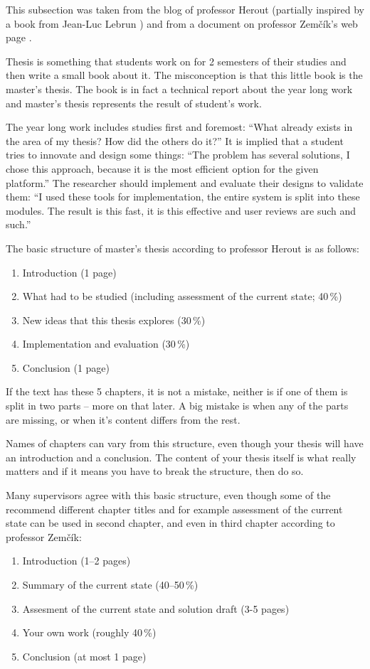 {{This subsection was taken from the blog of professor Herout\cite{Herout} (partially inspired by a book from Jean-Luc Lebrun \cite{Lebrun2011}) and from a document on professor Zemčík's web page \cite{Zemcik}.
\bigskip

Thesis is something that students work on for 2 semesters of their studies and then write a small book about it. The misconception is that this little book is the master's thesis. The book is in fact a technical report about the year long work and master's thesis represents the result of student's work.

The year long work includes studies first and foremost: ``What already exists in the area of my thesis? How did the others do it?'' It is implied that a student tries to innovate and design some things: ``The problem has several solutions, I chose this approach, because it is the most efficient option for the given platform.''
The researcher should implement and evaluate their designs to validate them: ``I used these tools for implementation, the entire system is split into these modules. The result is this fast, it is this effective and user reviews are such and such.''

The basic structure of master's thesis according to professor Herout is as follows:
\begin{enumerate}
  \item{Introduction (1 page)}
  \item{What had to be studied (including assessment of the current state; 40\,\%)}
  \item{New ideas that this thesis explores (30\,\%)}
  \item{Implementation and evaluation (30\,\%)}
  \item{Conclusion (1 page)}
\end{enumerate}

If the text has these 5 chapters, it is not a mistake, neither is if one of them is split in two parts -- more on that later. A big mistake is when any of the parts are missing, or when it's content differs from the rest.

Names of chapters can vary from this structure, even though your thesis will have an introduction and a conclusion. The content of your thesis itself is what really matters and if it means you have to break the structure, then do so.

Many supervisors agree with this basic structure, even though some of the recommend different chapter titles and for example assessment of the current state can be used in second chapter, and even in third chapter according to professor Zemčík:
\begin{enumerate}
\item Introduction (1--2 pages)
\item Summary of the current state (40--50\,\%)
\item Assesment of the current state and solution draft (3-5 pages)
\item Your own work (roughly 40\,\%)
\item Conclusion (at most 1 page)
\end{enumerate}

}}
